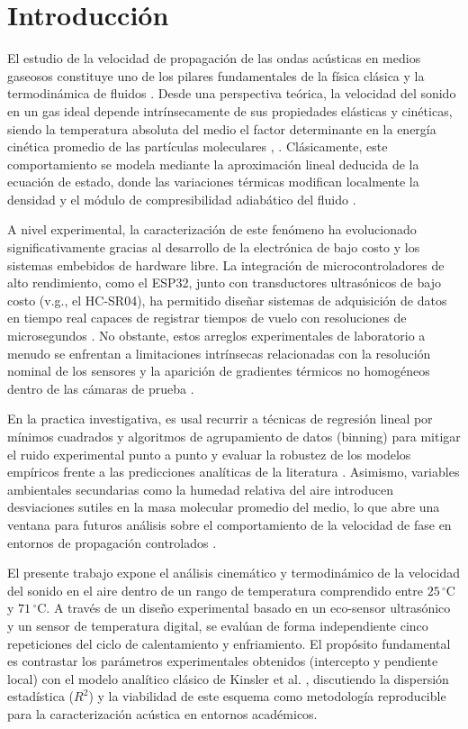\documentclass[conference]{IEEEtran}
\begin{document}
\section{Introducción}
El estudio de la velocidad de propagación de las ondas acústicas en medios gaseosos constituye uno de los pilares fundamentales de la física clásica y la termodinámica de fluidos \cite{morse1986}. Desde una perspectiva teórica, la velocidad del sonido en un gas ideal depende intrínsecamente de sus propiedades elásticas y cinéticas, siendo la temperatura absoluta del medio el factor determinante en la energía cinética promedio de las partículas moleculares \cite{kinsler2000}, \cite{pierce1989}. Clásicamente, este comportamiento se modela mediante la aproximación lineal deducida de la ecuación de estado, donde las variaciones térmicas modifican localmente la densidad y el módulo de compresibilidad adiabático del fluido \cite{holman2011}.

A nivel experimental, la caracterización de este fenómeno ha evolucionado significativamente gracias al desarrollo de la electrónica de bajo costo y los sistemas embebidos de hardware libre. La integración de microcontroladores de alto rendimiento, como el ESP32, junto con transductores ultrasónicos de bajo costo (v.g., el HC-SR04), ha permitido diseñar sistemas de adquisición de datos en tiempo real capaces de registrar tiempos de vuelo con resoluciones de microsegundos \cite{acebott2024}. No obstante, estos arreglos experimentales de laboratorio a menudo se enfrentan a limitaciones intrínsecas relacionadas con la resolución nominal de los sensores y la aparición de gradientes térmicos no homogéneos dentro de las cámaras de prueba \cite{dally1993}.

En la practica investigativa, es usal recurrir a técnicas de regresión lineal por mínimos cuadrados y algoritmos de agrupamiento de datos (binning) para mitigar el ruido experimental punto a punto y evaluar la robustez de los modelos empíricos frente a las predicciones analíticas de la literatura \cite{montgomery2012}. Asimismo, variables ambientales secundarias como la humedad relativa del aire introducen desviaciones sutiles en la masa molecular promedio del medio, lo que abre una ventana para futuros análisis sobre el comportamiento de la velocidad de fase en entornos de propagación controlados \cite{cramer1993}.

El presente trabajo expone el análisis cinemático y termodinámico de la velocidad del sonido en el aire dentro de un rango de temperatura comprendido entre $25\,^{\circ}\text{C}$ y $71\,^{\circ}\text{C}$. A través de un diseño experimental basado en un eco-sensor ultrasónico y un sensor de temperatura digital, se evalúan de forma independiente cinco repeticiones del ciclo de calentamiento y enfriamiento. El propósito fundamental es contrastar los parámetros experimentales obtenidos (intercepto y pendiente local) con el modelo analítico clásico de Kinsler et al. \cite{kinsler2000}, discutiendo la dispersión estadística ($R^2$) y la viabilidad de este esquema como metodología reproducible para la caracterización acústica en entornos académicos.
\end{document}
